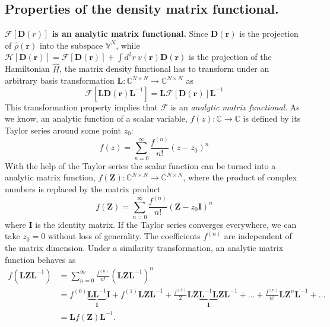 \documentclass[journal=jacsat,manuscript=article]{achemso}
\newcommand\m[1]{\mathbf{#1}}
\renewcommand\vec[1]{\mathbf{#1}}
\begin{document}
\subsection{Properties of the density matrix functional.}


\textbf{$\mathcal{F}[\m{D}(r)]$ is an analytic matrix functional.}
Since $\m{D}(\vec{r})$ is the projection of $\hat{\rho}(\vec{r})$ into the subspace $\mathbb{V}^{N}$, while ${\mathcal{H}[\m{D}(\vec{r})] = \mathcal{F}[\m{D}(\vec{r})] + \int d^3r ~ v(\vec{r}) \m{D}(\vec{r})}$ is the projection of the Hamiltonian $\hat{H}$, the matrix density functional has to transform under an arbitrary basis transformation $\m{L} : \mathbb{C}^{N \times N} \to \mathbb{C}^{N \times N}$ as \cite{Lu2022JPCL}
\begin{equation}
\mathcal{F}[\m{L} \m{D}(\vec{r}) \m{L}^{-1}] = \m{L} \mathcal{F}[\mathbf{D}(\vec{r})] \mathbf{L}^{-1} \label{eqn:basis_transformation_symmetry}
\end{equation}
This transformation property implies that $\mathcal{F}$ is an \emph{analytic matrix functional}. As we know, an analytic function of a scalar variable, $f(z): \mathbb{C} \to \mathbb{C}$ is defined by its Taylor series around some point $z_0$:
\begin{equation}
f(z) = \sum_{n=0}^{\infty} \frac{f^{(n)}}{n!} (z-z_0)^n
\end{equation}
With the help of the Taylor series the scalar function can be turned into a analytic matrix function, $f(\m{Z}): \mathbb{C}^{N \times N} \to \mathbb{C}^{N \times N}$, where the product of complex numbers is replaced by the matrix product
\begin{equation}
f(\m{Z}) = \sum_{n=0}^{\infty} \frac{f^{(n)}}{n!} (\m{Z} - z_0 \m{I})^n
\end{equation}
where $\m{I}$ is the identity matrix. If the Taylor series converges everywhere, we can take $z_0 = 0$ without loss of generality.
The coefficients $f^{(n)}$ are independent of the matrix dimension. Under a similarity transformation, an analytic matrix function behaves as
\begin{equation}
\begin{split}
  f(\m{L} \m{Z} \m{L}^{-1}) &= \sum_{n=0}^{\infty} \frac{f^{(n)}}{n!} (\m{L} \m{Z} \m{L}^{-1})^n \\
  &= f^{(0)} \underbrace{\m{L} \m{L}^{-1}}_{\m{I}} \m{I}
  + f^{(1)} \m{L} \m{Z} \m{L}^{-1}
  + \frac{f^{(2)}}{2} \m{L} \m{Z} \underbrace{\m{L}^{-1} \m{L}}_{\m{I}} \m{Z} \m{L}^{-1}
  + \ldots
  + \frac{f^{(n)}}{n!} \m{L} \m{Z}^n \m{L}^{-1} + \ldots \\
  &= \m{L} f(\m{Z}) \m{L}^{-1}.
\end{split}
\end{equation}
\end{document}
